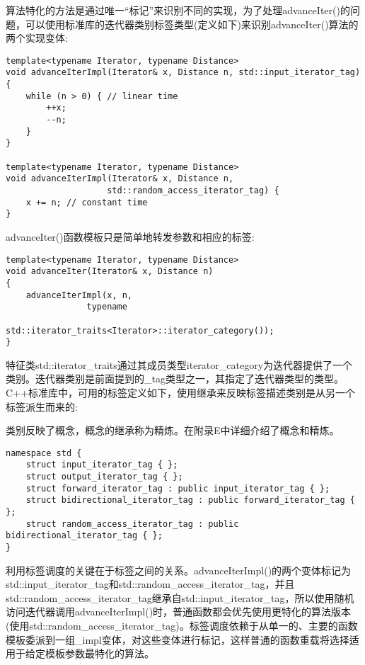 
算法特化的方法是通过唯一“标记”来识别不同的实现，为了处理advanceIter()的问题，可以使用标准库的迭代器类别标签类型(定义如下)来识别advanceIter()算法的两个实现变体:

\begin{lstlisting}[style=styleCXX]
template<typename Iterator, typename Distance>
void advanceIterImpl(Iterator& x, Distance n, std::input_iterator_tag)
{
	while (n > 0) { // linear time
		++x;
		--n;
	}
}

template<typename Iterator, typename Distance>
void advanceIterImpl(Iterator& x, Distance n,
					std::random_access_iterator_tag) {
	x += n; // constant time
}
\end{lstlisting}

advanceIter()函数模板只是简单地转发参数和相应的标签:

\begin{lstlisting}[style=styleCXX]
template<typename Iterator, typename Distance>
void advanceIter(Iterator& x, Distance n)
{
	advanceIterImpl(x, n,
				typename
						std::iterator_traits<Iterator>::iterator_category());
}
\end{lstlisting}

特征类std::iterator\_traits通过其成员类型iterator\_category为迭代器提供了一个类别。迭代器类别是前面提到的\_tag类型之一，其指定了迭代器类型的类型。C++标准库中，可用的标签定义如下，使用继承来反映标签描述类别是从另一个标签派生而来的:

\begin{tcolorbox}[colback=webgreen!5!white,colframe=webgreen!75!black]
\hspace*{0.75cm}类别反映了概念，概念的继承称为精炼。在附录E中详细介绍了概念和精炼。
\end{tcolorbox}

\begin{lstlisting}[style=styleCXX]
namespace std {
	struct input_iterator_tag { };
	struct output_iterator_tag { };
	struct forward_iterator_tag : public input_iterator_tag { };
	struct bidirectional_iterator_tag : public forward_iterator_tag { };
	struct random_access_iterator_tag : public bidirectional_iterator_tag { };
}
\end{lstlisting}

利用标签调度的关键在于标签之间的关系。advanceIterImpl()的两个变体标记为std::input\_iterator\_tag和std::random\_access\_iterator\_tag，并且std::random\_access\_iterator\_tag继承自std::input\_iterator\_tag，所以使用随机访问迭代器调用advanceIterImpl()时，普通函数都会优先使用更特化的算法版本(使用std::random\_access\_iterator\_tag)。标签调度依赖于从单一的、主要的函数模板委派到一组\_impl变体，对这些变体进行标记，这样普通的函数重载将选择适用于给定模板参数最特化的算法。

